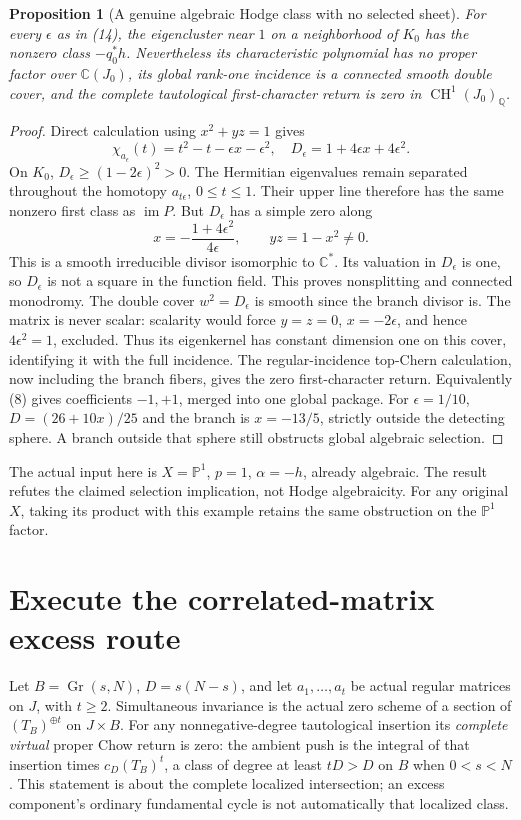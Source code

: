 \documentclass[11pt]{article}
\newtheorem{proposition}[theorem]{Proposition}
\newcommand{\Q}{\mathbb Q}
\newcommand{\CH}{\operatorname{CH}}
\newcommand{\Gr}{\operatorname{Gr}}
\begin{document}
\begin{proposition}[A genuine algebraic Hodge class with no selected sheet]
For every $\epsilon$ as in (14), the eigencluster near $1$ on a neighborhood
of $K_0$ has the nonzero class $-q_0^*h$. Nevertheless its characteristic
polynomial has no proper factor over $\mathbb C(J_0)$, its global
rank-one incidence is a connected smooth double cover, and the complete
tautological first-character return is zero in $\CH^1(J_0)_\Q$.
\end{proposition}
\begin{proof}
Direct calculation using $x^2+yz=1$ gives
\[
 \chi_{a_\epsilon}(t)=t^2-t-\epsilon x-\epsilon^2,
 \quad D_\epsilon=1+4\epsilon x+4\epsilon^2.           \tag{15}
\]
On $K_0$, $D_\epsilon\geq(1-2\epsilon)^2>0$.
The Hermitian eigenvalues remain separated throughout the homotopy
$a_{t\epsilon}$, $0\leq t\leq1$. Their upper line therefore has the
same nonzero first class as $\operatorname{im}P$.
But $D_\epsilon$ has a simple zero along
\[
 x=-\frac{1+4\epsilon^2}{4\epsilon},\qquad yz=1-x^2\ne0.
\]
This is a smooth irreducible divisor isomorphic to $\mathbb C^*$.
Its valuation in $D_\epsilon$ is one, so $D_\epsilon$ is not a square
in the function field. This proves nonsplitting and connected monodromy.
The double cover $w^2=D_\epsilon$ is smooth since the branch divisor is.
The matrix is never scalar: scalarity would force $y=z=0$, $x=-2\epsilon$,
and hence $4\epsilon^2=1$, excluded. Thus its eigenkernel has constant
dimension one on this cover, identifying it with the full incidence.
The regular-incidence top-Chern calculation, now including the branch
fibers, gives the zero first-character return. Equivalently (8) gives
coefficients $-1,+1$, merged into one global package.
For $\epsilon=1/10$, $D=(26+10x)/25$ and the branch is $x=-13/5$,
strictly outside the detecting sphere. A branch outside that sphere still
obstructs global algebraic selection.
\end{proof}
The actual input here is $X=\mathbb P^1$, $p=1$, $\alpha=-h$, already
algebraic. The result refutes the claimed selection implication, not Hodge
algebraicity. For any original $X$, taking its product with this example
retains the same obstruction on the $\mathbb P^1$ factor.

\section{Execute the correlated-matrix excess route}
Let $B=\Gr(s,N)$, $D=s(N-s)$, and let $a_1,\ldots,a_t$ be actual regular
matrices on $J$, with $t\geq2$. Simultaneous invariance is the actual zero
scheme of a section of $(T_B)^{\oplus t}$ on $J\times B$.
For any nonnegative-degree tautological insertion its \emph{complete
virtual} proper Chow return is zero: the ambient push is the integral of
that insertion times $c_D(T_B)^t$, a class of degree at least $tD>D$
on $B$ when $0<s<N$. This statement is about the complete localized
intersection; an excess component's ordinary fundamental cycle is not
automatically that localized class.
\end{document}
